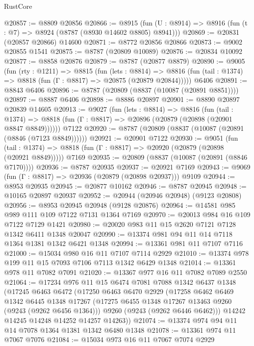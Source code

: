 \begin{lexlean}{RustCore}
\begin{coremodule}
@20857 := @8809 @20856
@20866 := @8915
    (fun (U : @8914) => @8916 (fun (t : @7) => @8924 (@8787 (@8930 @14602 @8805) @8941)))
@20869 := @20831 (@20857 @20866) @14600
@20871 := @8772 @20856 @20866
@20873 := @9002 @20855 @1541
@20875 := @8787 (@20809 @10089)
@20876 := @20834 @10092
@20877 := @8858 @20876
@20879 := @8787 (@20877 @8879)
@20890 := @9005
    (fun (rty : @1211) =>
    @8815
      (fun (lets : @8814) =>
      @8816 (fun (tail : @1374) => @8818 (fun (Γ : @8817) => @20875 (@20879 @20844)))))
    @6406
@20891 := @8843 @6406
@20896 := @8787 (@20809 (@8837 (@10087 (@20891 @8851))))
@20897 := @8887 @6406
@20898 := @8886 @20897
@20901 := @8890 @20897 @20839 @14605
@20913 := @9027
    (fun (lets : @8814) =>
    @8816
      (fun (tail : @1374) =>
      @8818 (fun (Γ : @8817) => @20896 (@20879 (@20898 (@20901 @8847 @8849))))))
    @7122
@20920 := @8787 (@20809 (@8837 (@10087 (@20891 (@8846 (@7123 @8849))))))
@20921 := @20901 @7122
@20930 := @9051
    (fun (tail : @1374) => @8818 (fun (Γ : @8817) => @20920 (@20879 (@20898 (@20921 @8849)))))
    @7169
@20935 := @20809 (@8837 (@10087 (@20891 (@8846 @7170))))
@20936 := @8787 @20935
@20937 := @20921 @7169
@20943 := @9069 (fun (Γ : @8817) => @20936 (@20879 (@20898 @20937))) @9109
@20944 := @8953 @20935
@20945 := @20877 @10162
@20946 := @8787 @20945
@20948 := @10165 @20897 @20937
@20952 := @20944 (@20946 @20948) (@9123 @20808)
@20956 := @8953 @20945 @20948 (@9128 @20876)
@20964 := @14581 @985 @989 @111 @109 @7122 @7131 @1364 @7169
@20970 := @20013 @984 @16 @109 @7122 @7129 @1421
@20980 := @20020 @983 @11 @15 @2620 @7121 @7128 @1342 @6411 @1348 @20047
@20990 := @13374 @981 @94 @11 @14 @7118 @1364 @1381 @1342 @6421 @1348
@20994 := @13361 @981 @11 @7107 @7116
@21000 := @15034 @980 @16 @11 @7107 @7114 @2929
@21010 := @13374 @978 @199 @11 @15 @7093 @7106 @7113 @1342 @6429 @1348
@21014 := @13361 @978 @11 @7082 @7091
@21020 := @13367 @977 @16 @11 @7082 @7089 @2550
@21064 := @17234
    @976
    @11
    @15
    @6474
    @7081
    @7088
    @1342
    @6437
    @1348
    (@17245
      @6463
      @6472
      (@17250
        @6463
        @6470
        @2929
        (@17258
          @6462
          @6469
          @1342
          @6445
          @1348
          @17267
          (@17275 @6455 @1348 @17267 @13463 @9260 (@9243 (@9262 @6456 @1364)))
          @9260
          (@9243 (@9262 @6446 @6462)))
        @14242
        @14245
        @14248
        @14252
        @14257
        @14263))
@21074 := @13374 @974 @94 @11 @14 @7078 @1364 @1381 @1342 @6480 @1348
@21078 := @13361 @974 @11 @7067 @7076
@21084 := @15034 @973 @16 @11 @7067 @7074 @2929

\end{coremodule}
\end{lexlean}
